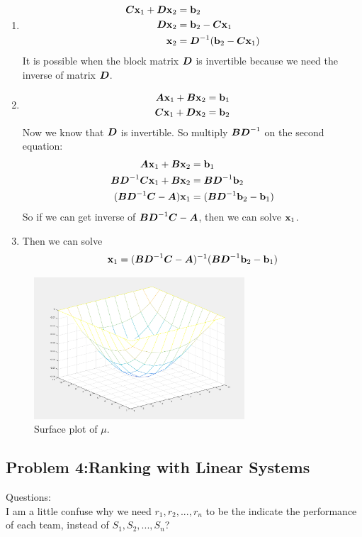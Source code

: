 \documentclass{article}
\begin{document}
\begin{enumerate} 
\item 
\begin{align*} 
\mC \vx_1+\mD \vx_2 & = \vb_2\\
\mD \vx_2 & = \vb_2-\mC \vx_1 \\
\vx_2 & = \mD^{-1}(\vb_2- \mC \vx_1) \\
\end{align*}
It is possible when the block matrix $\mD$ is invertible because we need the inverse of matrix $\mD$. \\

\item 
\begin{align*}
\mA\vx_1+\mB\vx_2=\vb_1\\
\mC\vx_1+\mD\vx_2=\vb_2 \\
\end{align*}
Now we know that $\mD$ is invertible. So multiply $\mB\mD^{-1}$ on the second equation: 
\begin{align*}
\mA\vx_1+\mB\vx_2 &=\vb_1\\
\mB\mD^{-1}\mC\vx_1+\mB\vx_2 &=\mB\mD^{-1}\vb_2 \\
(\mB\mD^{-1}\mC -\mA )\vx_1&= (\mB\mD^{-1}\vb_2- \vb_1)
\end{align*}
So if we can get inverse of $ \mB\mD^{-1}\mC -\mA $, then we can solve $\vx_1$.
\item 
Then we can solve \begin{align*}
\vx_1 = (\mB\mD^{-1}\mC -\mA )^{-1}(\mB\mD^{-1}\vb_2- \vb_1)\\
\end{align*}
\end{enumerate} 


\begin{figure}
\includegraphics[width=0.7\textwidth]{meshplot} 
\centering
\caption{Surface plot of $\mu$. } 
\end{figure}

\hypertarget{}{}
\subsection*{{Problem 4:Ranking with Linear Systems}}
\label{}
Questions: \\
I am a little confuse why we need ${r_1, r_2, ..., r_n} $ to be the indicate the performance of each team, instead of  ${S_1, S_2, ..., S_n} $? \\
\end{document}
